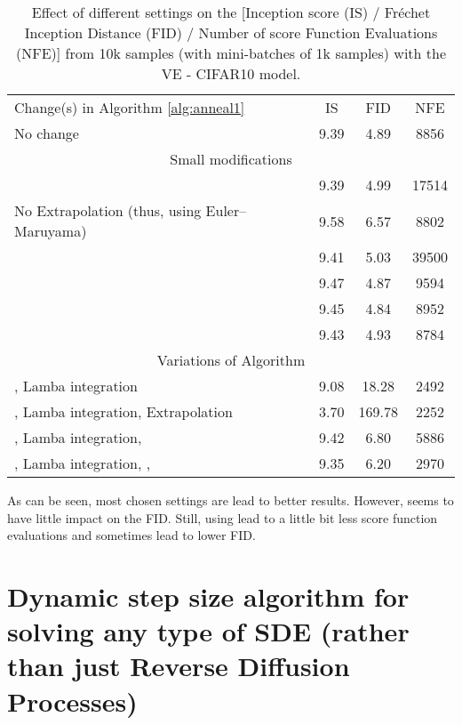 \documentclass{article}
\begin{document}
\begin{table}[!ht]
	\caption{Effect of different settings on the [Inception score (IS) / Fréchet Inception Distance (FID) / Number of score Function Evaluations (NFE)] from 10k samples (with mini-batches of 1k samples) with the VE - CIFAR10 model.}
	\label{tab:table2b}
	\centering
	\begin{tabular}{lccc}
		\toprule
		Change(s) in Algorithm \ref{alg:anneal1} & IS & FID & NFE \\
		\cmidrule(){1-4}
	    No change  & 9.39 & 4.89 & 8856 \\
	    \cmidrule(){1-4}
	    \multicolumn{4}{c}{Small modifications} \\
	    \cmidrule(){1-4}
	    & 9.39 & 4.99 & 17514 \\
	    No Extrapolation (thus, using Euler–Maruyama) & 9.58 & 6.57 & 8802 \\
	     & 9.41 & 5.03 & 39500 \\
	     & 9.47 & 4.87 & 9594 \\
	     & 9.45 & 4.84 & 8952 \\
	      & 9.43 & 4.93 & 8784 \\
	    \cmidrule(){1-4}
	    \multicolumn{4}{c}{Variations of \citet{lamba2003adaptive} Algorithm}\\
	    \cmidrule(){1-4}
	   , Lamba integration & 9.08 & 18.28 & 2492 \\
	   , Lamba integration, Extrapolation & 3.70 & 169.78 & 2252 \\
	   , Lamba integration,  & 9.42 & 6.80 & 5886 \\
	   , Lamba integration, ,  & 9.35 & 6.20 & 2970 \\
		\bottomrule
	\end{tabular}
\end{table}

As can be seen, most chosen settings are lead to better results. However,  seems to have little impact on the FID. Still, using  lead to a little bit less score function evaluations and sometimes lead to lower FID.

\clearpage

\section{Dynamic step size algorithm for solving any type of SDE (rather than just Reverse Diffusion Processes)}\label{sec:myalg}
\end{document}
